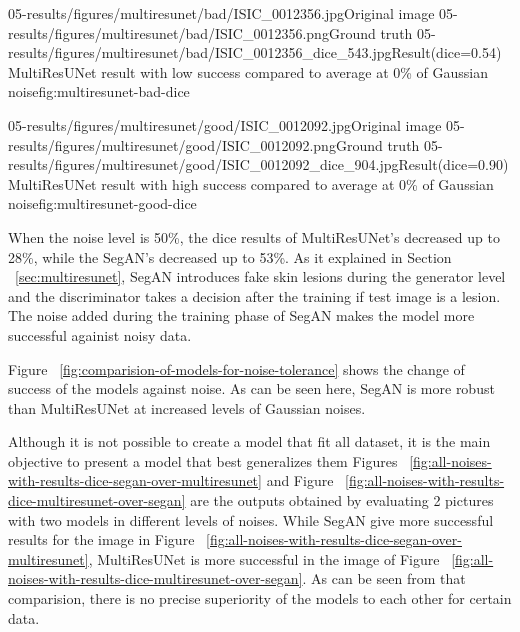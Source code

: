     \sidebyside
        {05-results/figures/multiresunet/bad/ISIC_0012356.jpg}{Original image}
        {05-results/figures/multiresunet/bad/ISIC_0012356.png}{Ground truth}
        {05-results/figures/multiresunet/bad/ISIC_0012356_dice_543.jpg}{Result(dice=0.54)}
        {MultiResUNet result with low success compared to average at 0\% of Gaussian noise}{fig:multiresunet-bad-dice}

    \sidebyside
        {05-results/figures/multiresunet/good/ISIC_0012092.jpg}{Original image}
        {05-results/figures/multiresunet/good/ISIC_0012092.png}{Ground truth}
        {05-results/figures/multiresunet/good/ISIC_0012092_dice_904.jpg}{Result(dice=0.90)}
        {MultiResUNet result with high success compared to average at 0\% of Gaussian noise}{fig:multiresunet-good-dice}

    When the noise level is 50\%, the dice results of MultiResUNet's decreased up to 28\%, while the SegAN's decreased up to 53\%.
    As it explained in Section ~\ref{sec:multiresunet}, SegAN introduces fake skin lesions during the generator level and the discriminator takes a decision after the training if test image is a lesion.
    The noise added during the training phase of SegAN makes the model more successful againist noisy data.

    Figure ~\ref{fig:comparision-of-models-for-noise-tolerance} shows the change of success of the models against noise.
    As can be seen here, SegAN is more robust than MultiResUNet at increased levels of Gaussian noises.


    

    

    

    

    

    

    



    Although it is not possible to create a model that fit all dataset, it is the main objective to present a model that best generalizes them
    Figures ~\ref{fig:all-noises-with-results-dice-segan-over-multiresunet} and Figure ~\ref{fig:all-noises-with-results-dice-multiresunet-over-segan}
    are the outputs obtained by evaluating 2 pictures with two models in different levels of noises.
    While SegAN give more successful results for the image in Figure ~\ref{fig:all-noises-with-results-dice-segan-over-multiresunet},
    MultiResUNet is more successful in the image of Figure ~\ref{fig:all-noises-with-results-dice-multiresunet-over-segan}.
    As can be seen from that comparision, there is no precise superiority of the models to each other for certain data.


